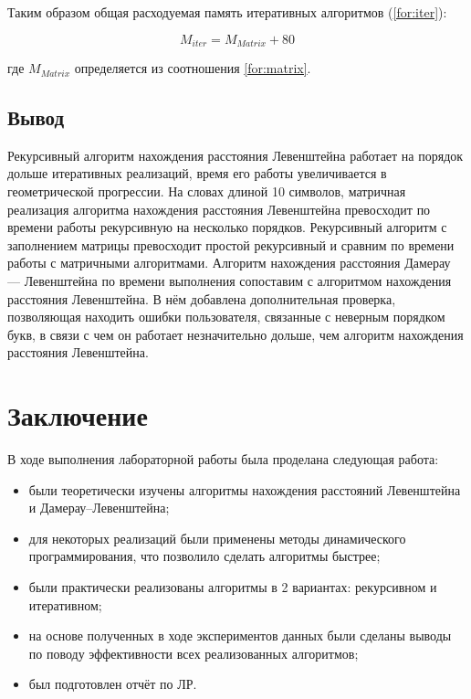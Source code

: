 \documentclass[a4paper,14pt, unknownkeysallowed]{extreport}
\begin{document}
Таким образом общая расходуемая память итеративных алгоритмов (\ref{for:iter}):

\begin{equation}
M_{iter} = M_{Matrix} + 80
\label{for:iter}
\end{equation}

где $M_{Matrix}$ определяется из соотношения \ref{for:matrix}.

\section{Вывод}

Рекурсивный алгоритм нахождения расстояния Левенштейна работает на порядок дольше итеративных реализаций, время его работы увеличивается в геометрической прогрессии. На словах длиной 10 символов, матричная реализация алгоритма нахождения расстояния Левенштейна превосходит по времени работы рекурсивную на несколько порядков. Рекурсивный алгоритм с заполнением матрицы превосходит простой рекурсивный и сравним по времени работы с матричными алгоритмами. Алгоритм нахождения расстояния Дамерау — Левенштейна по времени выполнения сопоставим с алгоритмом нахождения расстояния Левенштейна. В нём добавлена дополнительная проверка, позволяющая находить ошибки пользователя, связанные с неверным порядком букв, в связи с чем он работает незначительно дольше, чем алгоритм нахождения расстояния Левенштейна.

\chapter*{Заключение}

В ходе выполнения лабораторной работы была проделана следующая работа:

\begin{itemize}
    \item были теоретически изучены алгоритмы нахождения расстояний Левенштейна и Дамерау--Левенштейна;
	\item для некоторых реализаций были применены методы динамического программирования, что позволило сделать алгоритмы быстрее;
	\item были практически реализованы алгоритмы в 2 вариантах: рекурсивном и итеративном;
	\item на основе полученных в ходе экспериментов данных были сделаны выводы по поводу эффективности всех реализованных алгоритмов;
	\item был подготовлен отчёт по ЛР.
\end{itemize}
\end{document}
